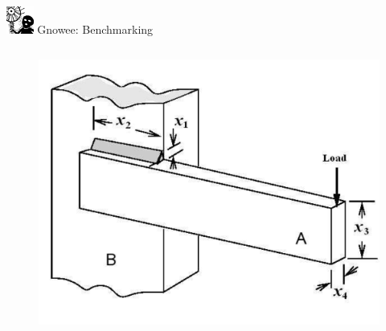 \documentclass[xcolor=x11names,compress]{beamer}
\renewcommand{\(}{\begin{columns}}
\renewcommand{\)}{\end{columns}}
\newcommand{\<}[1]{\begin{column}{#1}}
\renewcommand{\>}{\end{column}}
\begin{document}
\begin{frame}{\includegraphics[width=0.35in]{../figs/Gnowee.png} Gnowee: Benchmarking \cite{Walton2013a,Yang2014,Civicioglu2013}}
\begin{columns}
\begin{column}{0.33\linewidth}
\begin{figure}[htp]
      \end{figure}       
      \vspace{-0.75cm} 
      \begin{figure}[htp]
        \centering
        \includegraphics[width=1.0\textwidth, height=0.20\textheight]{../figs/WeldedBeam.png} 
      \end{figure}
    \end{column}
    

\end{columns}
\end{frame}
\end{document}
